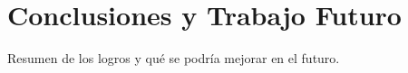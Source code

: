 \chapter{Conclusiones y Trabajo Futuro}
Resumen de los logros y qué se podría mejorar en el futuro.
